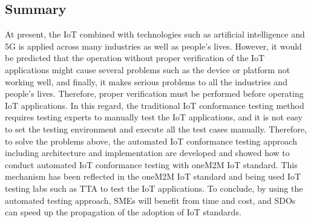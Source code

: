 \subsection{Summary}
At present, the IoT combined with technologies such as artificial intelligence and 5G is applied across many industries as well as people’s lives. However, it would be predicted that the operation without proper verification of the IoT applications might cause several problems such as the device or platform not working well, and finally, it makes serious problems to all the industries and people’s lives. Therefore, proper verification must be performed before operating IoT applications. In this regard, the traditional IoT conformance testing method requires testing experts to manually test the IoT applications, and it is not easy to set the testing environment and execute all the test cases manually. Therefore, to solve the problems above, the automated IoT conformance testing approach including architecture and implementation are developed and showed how to conduct automated IoT conformance testing with oneM2M IoT standard. This mechanism has been reflected in the oneM2M IoT standard and being used IoT testing labs such as TTA to test the IoT applications. To conclude, by using the automated testing approach, SMEs will benefit from time and cost, and SDOs can speed up the propagation of the adoption of IoT standards.
\clearpage